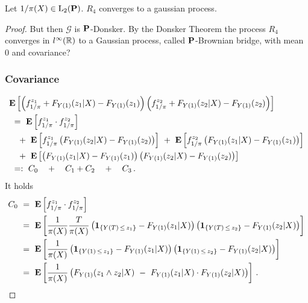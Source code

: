 \begin{lemma}
  \label{aa:mean:l:r4}
  Let
  $1/\pi(X)\in\mathrm{L}_2(\P)$.
  $R_4$ converges to a gaussian process.
\end{lemma}
\begin{proof}
But then $\mathcal{G}$ is $\P$-Donsker.
By the Donsker Theorem \cite[Theorem~19.5]{Vaart2000}
the process $R_4$ converges in $l^\infty(\R)$ to a Gaussian process, called $\P$-Brownian bridge, with mean 0 and covariance?
\subsubsection*{Covariance}
\begin{align*}
  &
  \E
  \left[
  \left( 
  f^{z_1}_{1/\pi}
  +
  F_{Y(1)}(z_1|X)
  -
F_{Y(1)}(z_1)
  \right)
  \left( 
  f^{z_2}_{1/\pi}
  +
  F_{Y(1)}(z_2|X)
  -
F_{Y(1)}(z_2)
  \right)
  \right]
  \\
  &
  \ 
  =
  \ 
\E
\left[
  f^{z_1}_{1/\pi}
  \cdot
  f^{z_2}_{1/\pi}
\right]
\\
  &
  \quad
  +
  \ 
  \E
  \left[
  f^{z_1}_{1/\pi}
  \left( 
  F_{Y(1)}(z_2|X)
  -
F_{Y(1)}(z_2)
  \right)
  \right]
  \ 
  +
  \ 
  \E
  \left[
  f^{z_2}_{1/\pi}
  \left( 
  F_{Y(1)}(z_1|X)
  -
F_{Y(1)}(z_1)
  \right)
  \right]
  \\
  &
  \quad
  +
  \ 
  \E
  \left[
  \left( 
  F_{Y(1)}(z_1|X)
  -
F_{Y(1)}(z_1)
  \right)
  \left( 
  F_{Y(1)}(z_2|X)
  -
F_{Y(1)}(z_2)
  \right)
  \right]
  \\
  &
  \ 
  =:
  \ 
  C_0
  \quad 
  +
  \quad 
  C_1
  +
  C_2
  \quad 
  +
  \quad 
  C_3
  \,.
\end{align*}
It holds
\begin{align*}
  C_0 
  &
  \ 
  =
  \ 
\E
\left[
  f^{z_1}_{1/\pi}
  \cdot
  f^{z_2}_{1/\pi}
\right]
\\
&
\ 
=
\ 
\E
\left[
\frac{1}{\pi(X)}
\frac{T}{\pi(X)}
\left( 
\mathbf{1}_{\left\{ Y(T)\,\le\, z_1 \right\}}
-
F_{Y(1)}(z_1|X)
\right)
\left( 
\mathbf{1}_{\left\{ Y(T)\,\le\, z_2 \right\}}
-
F_{Y(1)}(z_2|X)
\right)
\right]
\\
&
\ 
=
\ 
\E
\left[
\frac{1}{\pi(X)}
\left( 
\mathbf{1}_{\left\{ Y(1)\,\le\, z_1 \right\}}
-
F_{Y(1)}(z_1|X)
\right)
\left( 
\mathbf{1}_{\left\{ Y(1)\,\le\, z_2 \right\}}
-
F_{Y(1)}(z_2|X)
\right)
\right]
\\
&
\ 
=
\ 
\E
\left[
\frac{1}{\pi(X)}
\left( 
F_{Y(1)}(z_1\land z_2|X)
\ 
-
\ 
F_{Y(1)}(z_1|X)
\cdot
F_{Y(1)}(z_2|X)
\right)
\right]
\,.
\end{align*}

\end{proof}

